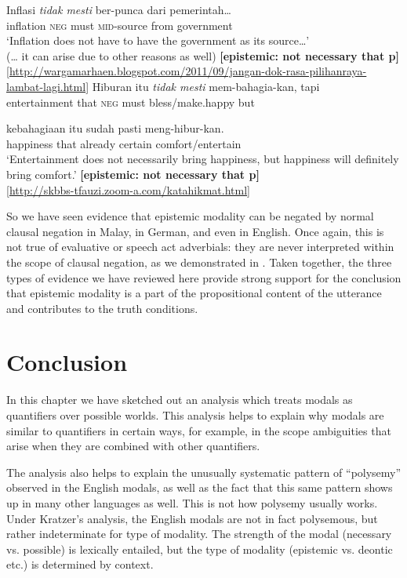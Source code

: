 \ea \label{ex:16.43}
\ea  \gll Inflasi  \textit{tidak  mesti}  ber-punca  dari  pemerintah…\\
inflation  \textsc{neg}  must  \textsc{mid}-source  from  government\\
\glt ‘Inflation does not have to have the government as its source…’\\
(… it can arise due to other reasons as well)      \textbf{[epistemic: not necessary that p]}\\
{}[\url{http://wargamarhaen.blogspot.com/2011/09/jangan-dok-rasa-pilihanraya-lambat-lagi.html}]
\ex \gll  Hiburan  itu  \textit{tidak  mesti}  mem-bahagia-kan,  tapi\\
entertainment  that  \textsc{neg}  must  bless/make.happy  but\\
\z \z

\ea 
  \gll kebahagiaan  itu  sudah  pasti  meng-hibur-kan.\\
happiness  that  already  certain  comfort/entertain\\
\glt ‘Entertainment does not necessarily bring happiness, but happiness will definitely bring comfort.’          \textbf{[epistemic: not necessary that p]}\\
{}[\url{http://skbbs-tfauzi.zoom-a.com/katahikmat.html}]
\z


So we have seen evidence that epistemic modality can be negated by normal clausal negation in Malay, in German, and even in English. Once again, this is not true of evaluative or speech act adverbials: they are never interpreted within the scope of clausal negation, as we demonstrated in . Taken together, the three types of evidence we have reviewed here provide strong support for the conclusion that epistemic modality is a part of the propositional content of the utterance and contributes to the truth conditions.


\section{Conclusion}\label{sec:16.6}

In this chapter we have sketched out an analysis which treats modals as quantifiers over possible worlds. This analysis helps to explain why modals are similar to quantifiers in certain ways, for example, in the scope ambiguities that arise when they are combined with other quantifiers.



The analysis also helps to explain the unusually systematic pattern of “polysemy” observed in the English modals, as well as the fact that this same pattern shows up in many other languages as well. This is not how polysemy usually works. Under Kratzer’s analysis, the English modals are not in fact polysemous, but rather indeterminate for type of modality. The strength of the modal (necessary vs. possible) is lexically entailed, but the type of modality (epistemic vs. deontic etc.) is determined by context.




